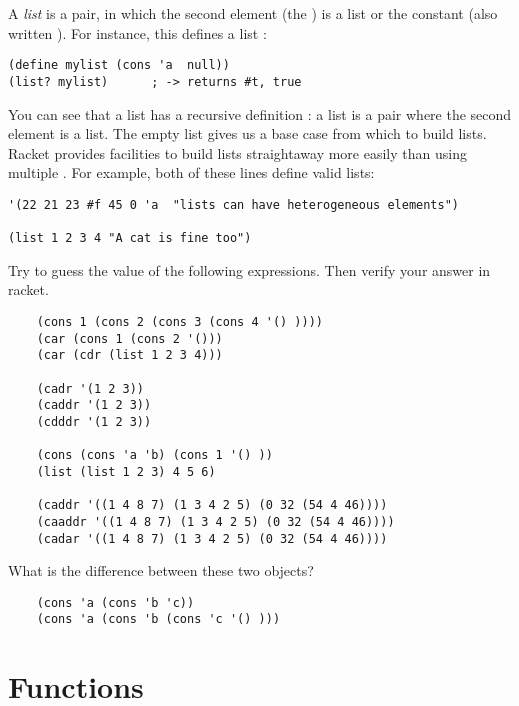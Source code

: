 \documentclass{../../../tp}
\begin{document}
A \emph{list} is a pair, in which the second element (the \cdr) is a list or the constant  (also written ). For instance, this defines a list :

\begin{verbatim}
(define mylist (cons 'a  null))
(list? mylist) 		; -> returns #t, true
\end{verbatim}

You can see that a list has a recursive definition : a list is a pair where the second element is a list. The empty list  gives us a base case from which to build lists. Racket provides facilities to build lists straightaway more easily than using multiple . For example, both of these lines define valid lists:

\begin{verbatim}
'(22 21 23 #f 45 0 'a  "lists can have heterogeneous elements")

(list 1 2 3 4 "A cat is fine too")
\end{verbatim}



\begin{instruction}
Try to guess the value of the following expressions. Then verify your answer in racket.

\begin{verbatim}
	(cons 1 (cons 2 (cons 3 (cons 4 '() ))))
	(car (cons 1 (cons 2 '()))
	(car (cdr (list 1 2 3 4)))
	
	(cadr '(1 2 3))
	(caddr '(1 2 3))
	(cdddr '(1 2 3))
	
	(cons (cons 'a 'b) (cons 1 '() ))
	(list (list 1 2 3) 4 5 6)
	
	(caddr '((1 4 8 7) (1 3 4 2 5) (0 32 (54 4 46))))
	(caaddr '((1 4 8 7) (1 3 4 2 5) (0 32 (54 4 46))))
	(cadar '((1 4 8 7) (1 3 4 2 5) (0 32 (54 4 46))))
\end{verbatim}
	
What is the difference between these two objects?
		
	\begin{verbatim}
	(cons 'a (cons 'b 'c))
	(cons 'a (cons 'b (cons 'c '() ))) 	
	\end{verbatim}
			
\end{instruction}



\section{Functions}
\end{document}
